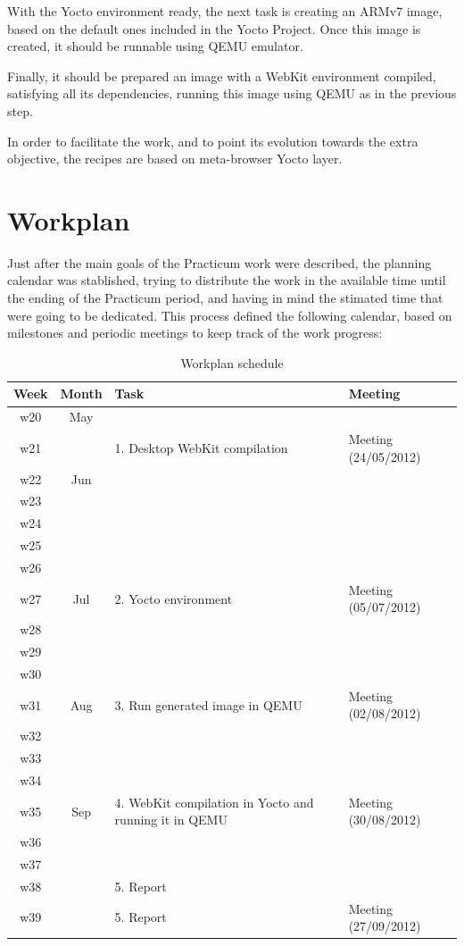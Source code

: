 \documentclass[a4paper,11pt,openany]{report}
\begin{document}
With the Yocto environment ready, the next task is creating an ARMv7 image, based on the default ones included in the Yocto Project. Once this image is created, it should be runnable using QEMU emulator.

Finally, it should be prepared an image with a WebKit environment compiled, satisfying all its dependencies, running this image using QEMU as in the previous step.

In order to facilitate the work, and to point its evolution towards the extra objective, the recipes are based on meta-browser Yocto layer.

\section{Workplan}
Just after the main goals of the Practicum work were described, the planning calendar was stablished, trying to distribute the work in the available time until the ending of the Practicum period, and having in mind the stimated time that were going to be dedicated.
This process defined the following calendar, based on milestones and periodic meetings to keep track of the work progress:
\\
\begin{table}
\begin{tabularx}{\textwidth}{|c|c|X|X|}
\hline 
Week & Month & Task & Meeting \\ 
\hline 
w20 & May &  &  \\ 
\hline 
w21 &  & 1. Desktop WebKit compilation & Meeting (24/05/2012) \\ 
\hline 
w22 & Jun &  &  \\ 
\hline 
w23 &  &  &  \\ 
\hline 
w24 &  &  &  \\ 
\hline 
w25 &  &  &  \\ 
\hline 
w26 &  &  &  \\ 
\hline 
w27 & Jul & 2. Yocto environment & Meeting (05/07/2012) \\ 
\hline 
w28 &  &  &  \\ 
\hline 
w29 &  &  &  \\ 
\hline 
w30 &  &  &  \\ 
\hline 
w31 & Aug & 3. Run generated image in QEMU & Meeting (02/08/2012) \\ 
\hline 
w32 &  &  &  \\ 
\hline 
w33 &  &  &  \\ 
\hline 
w34 &  &  &  \\ 
\hline 
w35 & Sep & 4. WebKit compilation in Yocto and running it in QEMU & Meeting (30/08/2012) \\ 
\hline 
w36 &  &  &  \\ 
\hline 
w37 &  &  &  \\ 
\hline 
w38 &  & 5. Report &  \\ 
\hline 
w39 &  & 5. Report & Meeting (27/09/2012) \\ 
\hline 
\end{tabularx}
\caption{Workplan schedule}
\end{table}
\end{document}
